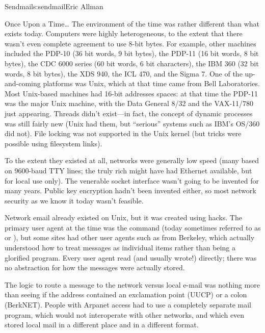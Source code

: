 \begin{aosachapter}{Sendmail}{s:sendmail}{Eric Allman}
\begin{aosasect1}{Once Upon a Time\ldots}
The environment of the time was rather different than what exists
today.  Computers were highly heterogeneous, to the extent that there
wasn't even complete agreement to use 8-bit bytes.
For example, other machines included the PDP-10 (36 bit words, 9 bit bytes),
the PDP-11 (16 bit words, 8 bit bytes),
the CDC 6000 series (60 bit words, 6 bit characters),
the IBM 360 (32 bit words, 8 bit bytes),
the XDS 940, the ICL 470, and the Sigma 7.
One of the up-and-coming platforms was Unix,
which at that time came from Bell Laboratories.
Most Unix-based
machines had 16-bit addresses spaces: at that time the PDP-11 was the
major Unix machine, with the Data General 8/32 and the VAX-11/780 just
appearing.  Threads didn't exist---in fact, the concept of dynamic
processes was still fairly new (Unix had them, but ``serious'' systems
such as IBM's OS/360 did not). File locking was not supported in the
Unix kernel (but tricks were possible using filesystem links).

To the extent they existed at all, networks were generally low speed
(many based on 9600-baud TTY lines; the truly rich might have had
Ethernet available, but for local use only). The venerable socket
interface wasn't going to be invented for many years. Public key
encryption hadn't been invented either, so most network security as we
know it today wasn't feasible.

Network email already existed on Unix, but it was created using
hacks.  The primary user agent at the time was the 
command (today sometimes referred to as  or
), but some sites had other user agents such as
 from Berkeley, which actually understood how to
treat messages as individual items rather than being a glorified
 program.  Every user agent read (and usually wrote!)
 directly; there was no abstraction for how the
messages were actually stored.

The logic to route a message to the network versus local e-mail was nothing
more than seeing if the address contained an exclamation point (UUCP)
or a colon (BerkNET). People with Arpanet access had to use a
completely separate mail program, which would not interoperate with
other networks, and which even stored local mail in a different place
and in a different format.


\end{aosasect1}
\end{aosachapter}
